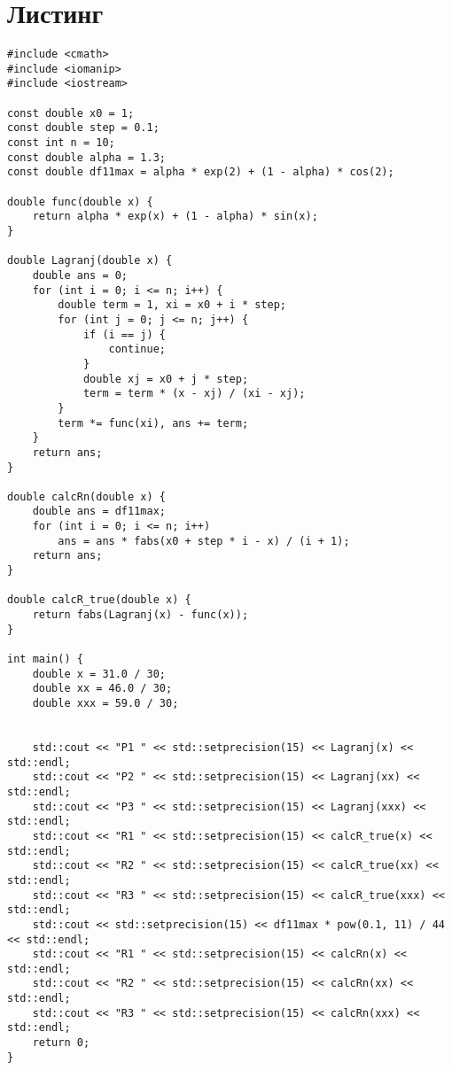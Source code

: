\documentclass[10pt]{scrartcl}
\makeatletter
\newcommand{\verbatimfont}[1]{\renewcommand{\verbatim@font}{\ttfamily#1}}
\makeatother
\begin{document}
\section*{Листинг}
\verbatimfont{\small}
\begin{verbatim}
#include <cmath>
#include <iomanip>
#include <iostream>

const double x0 = 1;
const double step = 0.1;
const int n = 10;
const double alpha = 1.3;
const double df11max = alpha * exp(2) + (1 - alpha) * cos(2);

double func(double x) {
    return alpha * exp(x) + (1 - alpha) * sin(x);
}

double Lagranj(double x) {
    double ans = 0;
    for (int i = 0; i <= n; i++) {
        double term = 1, xi = x0 + i * step;
        for (int j = 0; j <= n; j++) {
            if (i == j) {
                continue;
            }
            double xj = x0 + j * step;
            term = term * (x - xj) / (xi - xj);
        }
        term *= func(xi), ans += term;
    }
    return ans;
}

double calcRn(double x) {
    double ans = df11max;
    for (int i = 0; i <= n; i++)
        ans = ans * fabs(x0 + step * i - x) / (i + 1);
    return ans;
}

double calcR_true(double x) {
    return fabs(Lagranj(x) - func(x));
}

int main() {
    double x = 31.0 / 30;
    double xx = 46.0 / 30;
    double xxx = 59.0 / 30;


    std::cout << "P1 " << std::setprecision(15) << Lagranj(x) << std::endl;
    std::cout << "P2 " << std::setprecision(15) << Lagranj(xx) << std::endl;
    std::cout << "P3 " << std::setprecision(15) << Lagranj(xxx) << std::endl;
    std::cout << "R1 " << std::setprecision(15) << calcR_true(x) << std::endl;
    std::cout << "R2 " << std::setprecision(15) << calcR_true(xx) << std::endl;
    std::cout << "R3 " << std::setprecision(15) << calcR_true(xxx) << std::endl;
    std::cout << std::setprecision(15) << df11max * pow(0.1, 11) / 44 << std::endl;
    std::cout << "R1 " << std::setprecision(15) << calcRn(x) << std::endl;
    std::cout << "R2 " << std::setprecision(15) << calcRn(xx) << std::endl;
    std::cout << "R3 " << std::setprecision(15) << calcRn(xxx) << std::endl;
    return 0;
}
\end{verbatim}
\end{document}
